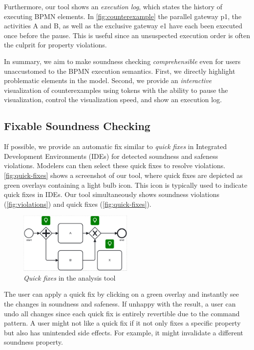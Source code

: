 \documentclass[runningheads]{llncs}
\begin{document}
Furthermore, our tool shows an \textit{execution log}, which states the history of executing BPMN elements.
In \autoref{fig:counterexample} the parallel gateway \textsf{p1}, the activities \textsf{A} and \textsf{B}, as well as the exclusive gateway \textsf{e1} have each been executed once before the pause.
This is useful since an unsuspected execution order is often the culprit for property violations.

In summary, we aim to make soundness checking \textit{comprehensible} even for users unaccustomed to the BPMN execution semantics.
First, we directly highlight problematic elements in the model.
Second, we provide an \textit{interactive} visualization of counterexamples using tokens with the ability to pause the visualization, control the visualization speed, and show an execution log.

\subsection{Fixable Soundness Checking} \label{subsec:fixable-checking}

If possible, we provide an automatic fix similar to \textit{quick fixes} in Integrated Development Environments (IDEs) for detected soundness and safeness violations.
Modelers can then select these quick fixes to resolve violations.
\autoref{fig:quick-fixes} shows a screenshot of our tool, where quick fixes are depicted as green overlays containing a light bulb icon.
This icon is typically used to indicate quick fixes in IDEs.
Our tool simultaneously shows soundness violations (\autoref{fig:violations}) and quick fixes (\autoref{fig:quick-fixes}).

\begin{figure}[ht]
	\centering
	\includegraphics[width=0.5\textwidth]{images/quickfixes}
	\caption{\textit{Quick fixes} in the analysis tool}
	\label{fig:quick-fixes}
\end{figure}

The user can apply a quick fix by clicking on a green overlay and instantly see the changes in soundness and safeness.
If unhappy with the result, a user can undo all changes since each quick fix is entirely revertible due to the command pattern.
A user might not like a quick fix if it not only fixes a specific property but also has unintended side effects.
For example, it might invalidate a different soundness property.
\end{document}
